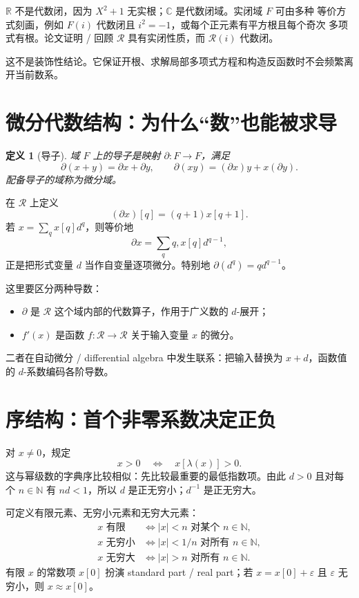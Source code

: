 \documentclass[11pt,a4paper]{article}
\newtheorem{definition}{定义}[section]
\theoremstyle{remark}
\newcommand{\LC}{\mathcal R}
\newcommand{\R}{\mathbb R}
\newcommand{\C}{\mathbb C}
\begin{document}
$\R$ 不是代数闭，因为 $X^2+1$ 无实根；$\C$ 是代数闭域。实闭域 $F$ 可由多种
等价方式刻画，例如 $F(i)$ 代数闭且 $i^2=-1$，或每个正元素有平方根且每个奇次
多项式有根。论文证明 / 回顾 $\LC$ 具有实闭性质，而 $\LC(i)$ 代数闭。

这不是装饰性结论。它保证开根、求解局部多项式方程和构造反函数时不会频繁离开当前数系。

\section{微分代数结构：为什么“数”也能被求导}

\begin{definition}[导子]
域 $F$ 上的导子是映射 $\partial:F\to F$，满足
\[
\partial(x+y)=\partial x+\partial y,
\qquad
\partial(xy)=(\partial x)y+x(\partial y).
\]
配备导子的域称为微分域。
\end{definition}

在 $\LC$ 上定义
\[
(\partial x)[q]=(q+1)x[q+1].
\]
若 $x=\sum_qx[q]d^q$，则等价地
\[
\partial x=\sum_q q,x[q]d^{q-1},
\]
正是把形式变量 $d$ 当作自变量逐项微分。特别地 $\partial(d^q)=qd^{q-1}$。

这里要区分两种导数：

\begin{itemize}
\item $\partial$ 是 $\LC$ 这个域内部的代数算子，作用于广义数的 $d$-展开；
\item $f'(x)$ 是函数 $f:\LC\to\LC$ 关于输入变量 $x$ 的微分。
\end{itemize}

二者在自动微分 / differential algebra 中发生联系：把输入替换为 $x+d$，函数值的
$d$-系数编码各阶导数。

\section{序结构：首个非零系数决定正负}

对 $x\ne0$，规定
\[
x>0\quad\Longleftrightarrow\quad x[\lambda(x)]>0.
\]
这与幂级数的字典序比较相似：先比较最重要的最低指数项。由此 $d>0$ 且对每个
$n\in\mathbb N$ 有 $nd<1$，所以 $d$ 是正无穷小；$d^{-1}$ 是正无穷大。

可定义有限元素、无穷小元素和无穷大元素：
\[
\begin{aligned}
x\text{ 有限}&\iff |x|<n\text{ 对某个 }n\in\mathbb N,\\
x\text{ 无穷小}&\iff |x|<1/n\text{ 对所有 }n\in\mathbb N,\\
x\text{ 无穷大}&\iff |x|>n\text{ 对所有 }n\in\mathbb N.
\end{aligned}
\]
有限 $x$ 的常数项 $x[0]$ 扮演 standard part / real part；若
$x=x[0]+\varepsilon$ 且 $\varepsilon$ 无穷小，则 $x\approx x[0]$。
\end{document}

